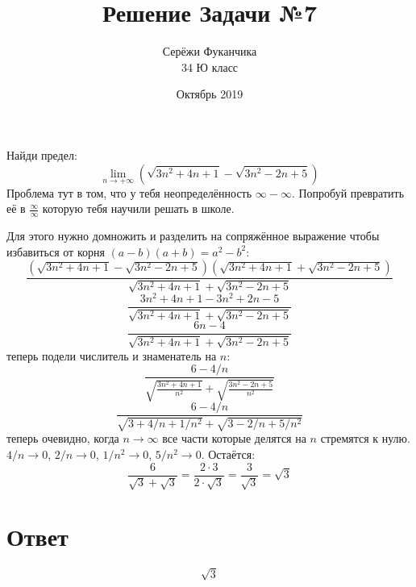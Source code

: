 \documentclass{article}
\title{Решение Задачи №7}
\author{Серёжи Фуканчика\\34 Ю класс}
\date{Октябрь 2019}
\begin{document}
\maketitle
Найди предел:
$$\lim_{n\to+\infty}{\left(\sqrt{3n^2+4n+1}-\sqrt{3n^2-2n+5}\right)}$$
Проблема тут в том, что у тебя неопределённость $\infty-\infty$. Попробуй превратить её в $\frac{\infty}{\infty}$ которую тебя научили решать в школе.

Для этого нужно домножить и разделить на сопряжённое выражение чтобы избавиться от корня $(a-b)(a+b)=a^2-b^2$:
$$\frac{\left(\sqrt{3n^2+4n+1}-\sqrt{3n^2-2n+5}\right)\left(\sqrt{3n^2+4n+1}+\sqrt{3n^2-2n+5}\right)}{\sqrt{3n^2+4n+1}+\sqrt{3n^2-2n+5}}$$
$$\frac{3n^2+4n+1-3n^2+2n-5}{\sqrt{3n^2+4n+1}+\sqrt{3n^2-2n+5}}$$
$$\frac{6n-4}{\sqrt{3n^2+4n+1}+\sqrt{3n^2-2n+5}}$$
теперь подели числитель и знаменатель на $n$:
$$\frac{6-4/n}{\sqrt{\frac{3n^2+4n+1}{n^2}}+\sqrt{\frac{3n^2-2n+5}{n^2}}}$$
$$\frac{6-4/n}{\sqrt{3+4/n+1/{n^2}}+\sqrt{3-2/n+5/{n^2}}}$$
теперь очевидно, когда $n\to\infty$ все части которые делятся на $n$ стремятся к нулю. $4/n\to{}0$, $2/n\to{}0$, $1/{n^2}\to0$, $5/{n^2}\to{}0$.
Остаётся:
$$\frac{6}{\sqrt{3}+\sqrt{3}}=\frac{2\cdot{}3}{2\cdot\sqrt{3}}=\frac{3}{\sqrt{3}}=\sqrt{3}$$

\section{Ответ}
$$\sqrt{3}$$
\end{document}
